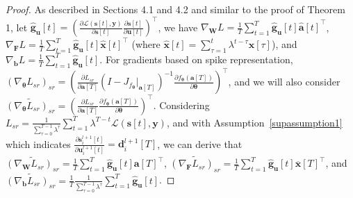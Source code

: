 \documentclass{article}
\begin{document}
\begin{proof}

As described in Sections 4.1 and 4.2 and similar to the proof of Theorem 1, let $\hat{\mathbf{g}}_{\mathbf{u}}[t]=\left(\frac{\partial \mathcal{L}(\mathbf{s}[t], \mathbf{y})}{\partial \mathbf{s}[t]}\frac{\partial \mathbf{s}[t]}{\partial \mathbf{u}[t]}\right)^\top$, we have $\nabla_{\mathbf{W}}L = \frac{1}{T} \sum_{t=1}^T \hat{\mathbf{g}}_{\mathbf{u}}[t] {\hat{\mathbf{a}}[t]}^\top$, $\nabla_{\mathbf{F}}L = \frac{1}{T} \sum_{t=1}^T \hat{\mathbf{g}}_{\mathbf{u}}[t] {\hat{\mathbf{x}}[t]}^\top$ (where $\hat{\mathbf{x}}[t]=\sum_{\tau=1}^t \lambda^{t-\tau}\mathbf{x}[\tau]$), and $\nabla_{\mathbf{b}}L = \frac{1}{T} \sum_{t=1}^T \hat{\mathbf{g}}_{\mathbf{u}}[t]$. For gradients based on spike representation, $\left(\nabla_{\bm{\theta}}L_{sr}\right)_{sr}=\left(\frac{\partial L_{sr}}{\partial \mathbf{a}[T]} \left(I-J_{f_{\bm{\theta}}}\vert_{\mathbf{a}[T]}\right)^{-1} \frac{\partial f_{\bm{\theta}}(\mathbf{a}[T])}{\partial \bm{\theta}}\right)^\top$, and we will also consider $\widetilde{\left(\nabla_{\bm{\theta}}L_{sr}\right)_{sr}} = \left(\frac{\partial L_{sr}}{\partial \mathbf{a}[T]} \frac{\partial f_{\bm{\theta}}(\mathbf{a}[T])}{\partial \bm{\theta}}\right)^\top$. Considering $L_{sr}=\frac{1}{\sum_{\tau=0}^{T-1}\lambda^\tau}\sum_{t=1}^T\lambda^{T-t}\mathcal{L}(\mathbf{s}[t], \mathbf{y})$, 
and with Assumption~\ref{supassumption1} which indicates $\frac{\partial \mathbf{s}^{l+1}_i[t]}{\partial \mathbf{u}^{l+1}_i[t]}=\mathbf{d}^{l+1}_i[T]$, we can derive that $\widetilde{\left(\nabla_{\mathbf{W}}L_{sr}\right)_{sr}} = \frac{1}{T} \sum_{t=1}^T \hat{\mathbf{g}}_{\mathbf{u}}[t] {\mathbf{a}}[T]^\top$, $\widetilde{\left(\nabla_{\mathbf{F}}L_{sr}\right)_{sr}} = \frac{1}{T} \sum_{t=1}^T \hat{\mathbf{g}}_{\mathbf{u}}[t] {\overline{\mathbf{x}}}[T]^\top$, and $\widetilde{\left(\nabla_{\mathbf{b}}L_{sr}\right)_{sr}} = \frac{1}{T}\frac{1}{\sum_{\tau=0}^{T-1}\lambda^\tau} \sum_{t=1}^T \hat{\mathbf{g}}_{\mathbf{u}}[t]$.


\end{proof}
\end{document}
